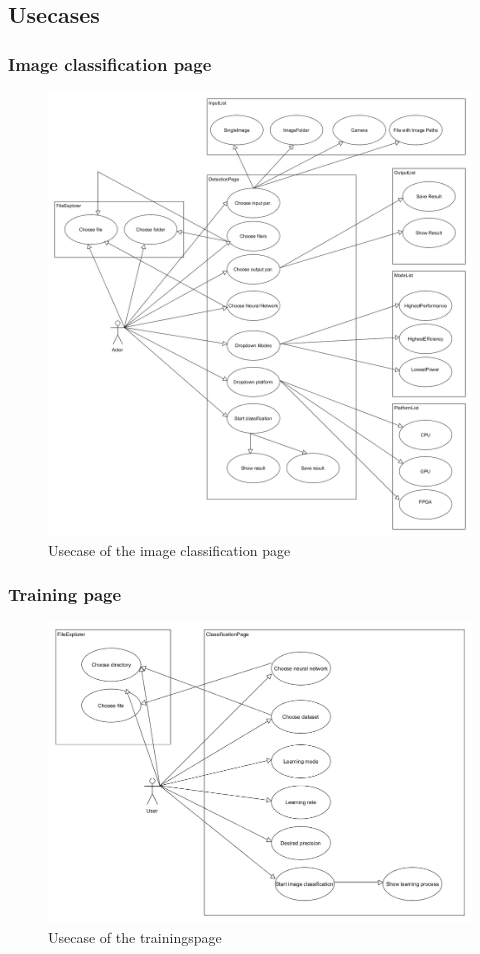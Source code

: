 \documentclass[parskip=full]{scrartcl}
\begin{document}
\subsection{Usecases}
\subsubsection{Image classification page}
\begin{figure}[htb!]
\centering
\includegraphics[width=\textwidth]{ClassificationUsecase}
\caption{Usecase of the image classification page}
\end{figure}
\newpage
\subsubsection{Training page}
\begin{figure}[htb!]
\centering
\includegraphics[width=\textwidth]{TrainUsecase}
\caption{Usecase of the trainingspage}
\end{figure}
\clearpage
\end{document}
